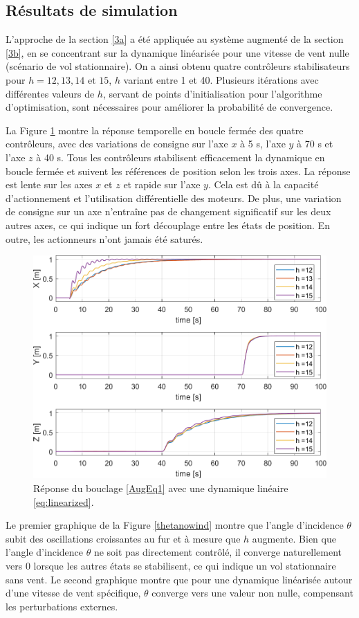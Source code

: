 \subsection{Résultats de simulation}

L'approche de la section \ref{3a} a été appliquée au système augmenté de la section \ref{3b}, en se concentrant sur la dynamique linéarisée pour une vitesse de vent nulle (scénario de vol stationnaire). On a ainsi obtenu quatre contrôleurs stabilisateurs pour $h=12, 13, 14 \text{ et } 15$, $h$ variant entre 1 et 40. Plusieurs itérations avec différentes valeurs de $h$, servant de points d'initialisation pour l'algorithme d'optimisation, sont nécessaires pour améliorer la probabilité de convergence.

La Figure \ref{HKStepRes_a} montre la réponse temporelle en boucle fermée des quatre contrôleurs, avec des variations de consigne sur l'axe $x$ à 5 s, l'axe $y$ à 70 s et l'axe $z$ à 40 s. Tous les contrôleurs stabilisent efficacement la dynamique en boucle fermée et suivent les références de position selon les trois axes. La réponse est lente sur les axes $x$ et $z$ et rapide sur l'axe $y$. Cela est dû à la capacité d'actionnement et l'utilisation différentielle des moteurs. De plus, une variation de consigne sur un axe n'entraîne pas de changement significatif sur les deux autres axes, ce qui indique un fort découplage entre les états de position. En outre, les actionneurs n'ont jamais été saturés.


\begin{figure}[hbt]
    \centering
   \includegraphics[width=0.7\columnwidth]{figures/stepResponse.png}
    \caption{Réponse du bouclage \eqref{AugEq1} avec une dynamique linéaire \eqref{eq:linearized}.}
    \label{HKStepRes_a}
\end{figure}

Le premier graphique de la Figure \ref{thetanowind} montre que l'angle d'incidence $\theta$ subit des oscillations croissantes au fur et à mesure que $h$ augmente. Bien que l'angle d'incidence $\theta$ ne soit pas directement contrôlé, il converge naturellement vers 0 lorsque les autres états se stabilisent, ce qui indique un vol stationnaire sans vent. Le second graphique montre que pour une dynamique linéarisée autour d'une vitesse de vent spécifique, $\theta$ converge vers une valeur non nulle, compensant les perturbations externes.

